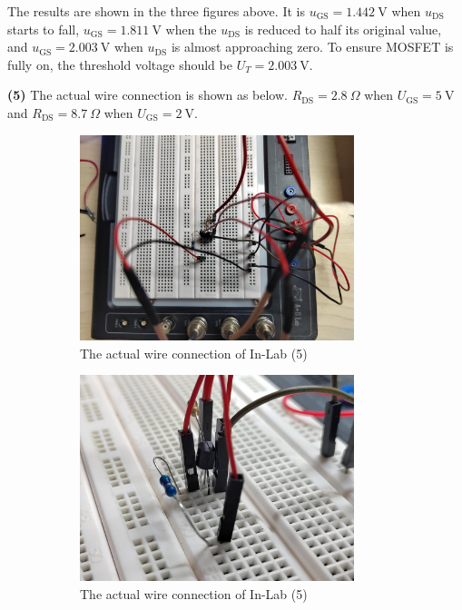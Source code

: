 \documentclass[UTF8]{report}
\theoremstyle{MyLineTheoremStyle} %
\theoremstyle{MyBlockTheoremStyle} %
\theoremstyle{MySubsubsectionStyle} %
\begin{document}
The results are shown in the three figures above. It is $u_{\text{GS}} = 1.442 \ \mathrm{V}$ when $u_{\text{DS}}$ starts to fall, $u_{\text{GS}} = 1.811 \ \mathrm{V}$ when the $u_{\text{DS}}$ is reduced to half its original value, and $u_{\text{GS}} = 2.003 \ \mathrm{V}$ when $u_{\text{DS}}$ is almost approaching zero. To ensure MOSFET is fully on, the threshold voltage should be $U_T = 2.003 \ \mathrm{V}$.

\noindent \textbf{(5) }
The actual wire connection is shown as below.
$R_{\text{DS}} = 2.8 \ \Omega$ when $U_{\text{GS}} = 5 \ \mathrm{V}$ and $R_{\text{DS}} = 8.7 \ \Omega$ when $U_{\text{GS}} = 2 \ \mathrm{V}$.

\begin{figure}[H]\centering
    \begin{subfigure}[b]{0.5\columnwidth}\centering
        \includegraphics[height=170pt]{assets/Lab1/IMG_20241017_174011.jpg}
        \caption{The actual wire connection of In-Lab (5)}
    \end{subfigure}\hfill
    \begin{subfigure}[b]{0.5\columnwidth}\centering
        \includegraphics[height=170pt]{assets/Lab1/IMG_20241017_174040.jpg}
        \caption{The actual wire connection of In-Lab (5)}
    \end{subfigure}
    \caption{}
\end{figure}
    
\end{document}
